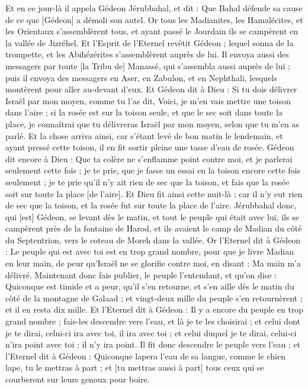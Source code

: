 \begin{multicols}{2}
Et en ce jour-là il appela Gédeon Jérubbahal, et dit : Que Bahal défende sa cause de ce que [Gédeon] a démoli son autel.
Or tous les Madianites, les Hamalécites, et les Orientaux s'assemblèrent tous, et ayant passé le Jourdain ils se campèrent en la vallée de Jizréhel.
Et l'Esprit de l'Eternel revêtit Gédeon ; lequel sonna de la trompette, et les Abihézérites s'assemblèrent auprès de lui.
Il envoya aussi des messagers par toute [la Tribu de] Manassé, qui s'assembla aussi auprès de lui ; puis il envoya des messagers en Aser, en Zabulon, et en Nephthali, lesquels montèrent pour aller au-devant d'eux.
Et Gédeon dit à Dieu : Si tu dois délivrer Israël par mon moyen, comme tu l'as dit,
Voici, je m'en vais mettre une toison dans l'aire ; si la rosée est sur la toison seule, et que le sec soit dans toute la place, je connaîtrai que tu délivreras Israël par mon moyen, selon que tu m'en as parlé.
Et la chose arriva ainsi, car s'étant levé de bon matin le lendemain, et ayant pressé cette toison, il en fit sortir pleine une tasse d'eau de rosée.
Gédeon dit encore à Dieu : Que ta colère ne s'enflamme point contre moi, et je parlerai seulement cette fois ; je te prie, que je fasse un essai en la toison encore cette fois seulement ; je te prie qu'il n'y ait rien de sec que la toison, et fais que la rosée soit sur toute la place [de l'aire].
Et Dieu fit ainsi cette nuit-là ; car il n'y eut rien de sec que la toison, et la rosée fut sur toute la place de l'aire.
\VerseOne{}Jérubbahal donc, qui [est] Gédeon, se levant dès le matin, et tout le peuple qui était avec lui, ils se campèrent près de la fontaine de Harod, et ils avaient le camp de Madian du côté du Septentrion, vers le coteau de Moreh dans la vallée.
Or l'Eternel dit à Gédeon : Le peuple qui est avec toi est en trop grand nombre, pour que je livre Madian en leur main, de peur qu'Israël ne se glorifie contre moi, en disant : Ma main m'a délivré.
Maintenant donc fais publier, le peuple l'entendant, et qu'on dise : Quiconque est timide et a peur, qu'il s'en retourne, et s'en aille dès le matin du côté de la montagne de Galaad ; et vingt-deux mille du peuple s'en retournèrent ; et il en resta dix mille.
Et l'Eternel dit à Gédeon : Il y a encore du peuple en trop grand nombre ; fais-les descendre vers l'eau, et là je te les choisirai ; et celui dont je te dirai, celui-ci ira avec toi, il ira avec toi ; et celui duquel je te dirai, celui-ci n'ira point avec toi ; il n'y ira point.
Il fit donc descendre le peuple vers l'eau ; et l'Eternel dit à Gédeon : Quiconque lapera l'eau de sa langue, comme le chien lape, tu le mettras à part ; et [tu mettras aussi à part] tous ceux qui se courberont sur leurs genoux pour boire.

\end{multicols}
